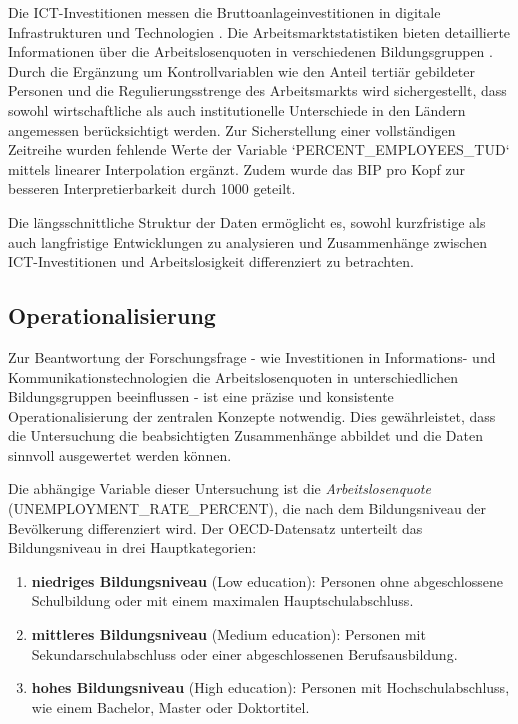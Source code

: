 Die \ac{ICT}-Investitionen messen die Bruttoanlageinvestitionen in digitale Infrastrukturen 
und Technologien \parencite{oecd2022ict}. Die Arbeitsmarktstatistiken bieten detaillierte 
Informationen über die Arbeitslosenquoten in verschiedenen Bildungsgruppen 
\parencite{oecd2022unemployment}. Durch die Ergänzung um Kontrollvariablen wie den Anteil 
tertiär gebildeter Personen und die Regulierungsstrenge des Arbeitsmarkts wird sichergestellt, 
dass sowohl wirtschaftliche als auch institutionelle Unterschiede in den Ländern angemessen 
berücksichtigt werden. Zur Sicherstellung einer vollständigen Zeitreihe wurden fehlende Werte 
der Variable `PERCENT\_EMPLOYEES\_TUD` mittels linearer Interpolation ergänzt. Zudem wurde
das \ac{BIP} pro Kopf zur besseren Interpretierbarkeit durch 1000 geteilt.

Die längsschnittliche Struktur der Daten ermöglicht es, sowohl kurzfristige als auch 
langfristige Entwicklungen zu analysieren und Zusammenhänge zwischen ICT-Investitionen und 
Arbeitslosigkeit differenziert zu betrachten.



\subsection{Operationalisierung}

Zur Beantwortung der Forschungsfrage - wie Investitionen in Informations- und 
Kommunikationstechnologien die Arbeitslosenquoten in unterschiedlichen Bildungsgruppen 
beeinflussen - ist eine präzise und konsistente Operationalisierung der zentralen Konzepte 
notwendig. Dies gewährleistet, dass die Untersuchung die beabsichtigten Zusammenhänge abbildet 
und die Daten sinnvoll ausgewertet werden können.

Die abhängige Variable dieser Untersuchung ist die \textit{Arbeitslosenquote} 
(UNEMPLOYMENT\_RATE\_PERCENT), die nach dem Bildungsniveau der Bevölkerung differenziert wird. 
Der \ac{OECD}-Datensatz unterteilt das Bildungsniveau in drei Hauptkategorien:

\begin{enumerate}
    \item \textbf{niedriges Bildungsniveau} (Low education): Personen ohne abgeschlossene 
    Schulbildung oder mit einem maximalen Hauptschulabschluss.
    \item \textbf{mittleres Bildungsniveau} (Medium education): Personen mit 
    Sekundarschulabschluss oder einer abgeschlossenen Berufsausbildung.
    \item \textbf{hohes Bildungsniveau} (High education): Personen mit Hochschulabschluss, wie 
    einem Bachelor, Master oder Doktortitel.
\end{enumerate}


